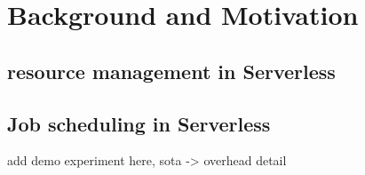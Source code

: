 \section{Background and Motivation}
\label{sec:background}





\subsection{resource management in Serverless}




\subsection{Job scheduling in Serverless}




add demo experiment here, sota -> overhead detail